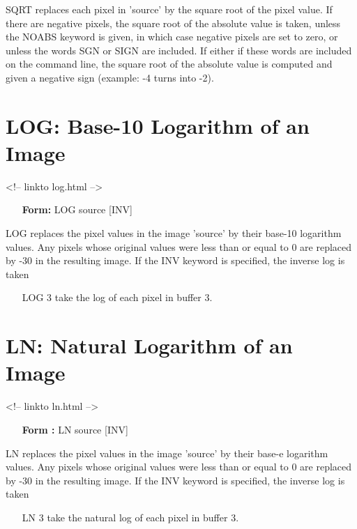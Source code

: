 SQRT replaces each pixel in 'source' by the square root of the pixel value.
If there are negative pixels, the square root of the absolute value is
taken, unless the NOABS keyword is given, in which case negative pixels are
set to zero, or unless the words SGN or SIGN are included.  If either if
these words are included on the command line, the square root of the
absolute value is computed and given a negative sign (example: -4 turns
into -2).

\section{LOG: Base-10 Logarithm of an Image}
\begin{rawhtml}
<!-- linkto log.html -->
\end{rawhtml}
\begin{itemize}
  \item[\textbf{Form:} LOG source {[INV]}\hfill]{}
\end{itemize}

LOG replaces the pixel values in the image 'source' by their base-10
logarithm values. Any pixels whose original values were less than or equal
to 0 are replaced by -30 in the resulting image.  If the INV keyword is
specified, the inverse log is taken

\begin{itemize}
  \item[LOG 3\hfill]{take the log of each pixel in buffer 3.}
\end{itemize}

\section{LN: Natural Logarithm of an Image}
\begin{rawhtml}
<!-- linkto ln.html -->
\end{rawhtml}
\begin{itemize}
  \item[\textbf{Form :} LN source {[INV]}\hfill]{}
\end{itemize}

LN replaces the pixel values in the image 'source' by their base-e
logarithm values. Any pixels whose original values were less than or equal
to 0 are replaced by -30 in the resulting image.  If the INV keyword is
specified, the inverse log is taken

\begin{itemize}
  \item[LN 3\hfill]{take the natural log of each pixel in buffer 3.}
\end{itemize}

